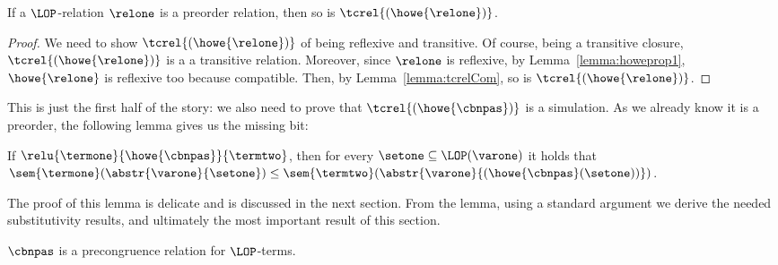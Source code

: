 \begin{lemma}\label{lemma:tcrelPO}
  If a $\LOP$-relation $\relone$ is a preorder relation, then so is
  $\tcrel{(\howe{\relone})}$.
\end{lemma}
\begin{proof}
  We need to show $\tcrel{(\howe{\relone})}$ of being reflexive and transitive. Of course, being a transitive closure,
  $\tcrel{(\howe{\relone})}$ is a a transitive relation. Moreover, since
  $\relone$ is reflexive, by Lemma~\ref{lemma:howeprop1}, $\howe{\relone}$
  is reflexive too because compatible. Then, by Lemma~\ref{lemma:tcrelCom},
  so is $\tcrel{(\howe{\relone})}$.
\end{proof}
This is just the first half of the story: we also need
to prove that $\tcrel{(\howe{\cbnpas})}$ is  a
simulation. As we already know it is a preorder, the following lemma
gives us the missing bit:
\begin{lemma}\label{lemma:keylemma}
  If $\relu{\termone}{\howe{\cbnpas}}{\termtwo}$, then for every
  $\setone\subseteq\LOP(\varone)$ it holds that
  $\sem{\termone}(\abstr{\varone}{\setone})\leq\sem{\termtwo}(\abstr{\varone}{(\howe{\cbnpas}(\setone))})$.
\end{lemma} 
The proof of this lemma is delicate and is discussed in the next section.
From the lemma, using a standard argument we derive the needed
substitutivity results, and ultimately the most important result
of this section.
\begin{theorem}\label{thm:pasprecongrCBN}
  $\cbnpas$ is a precongruence relation for $\LOP$-terms.
\end{theorem}
